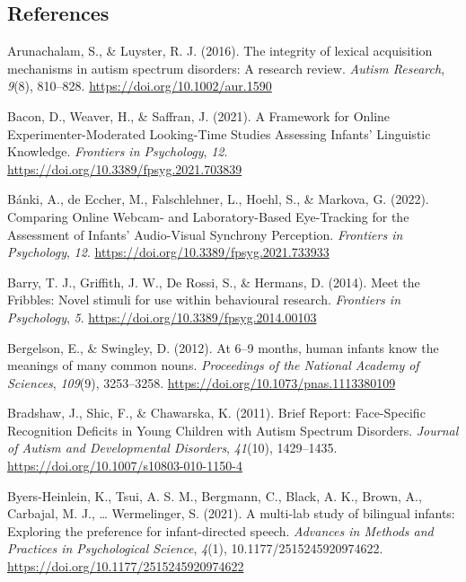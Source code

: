 \documentclass[
  english,
  man,floatsintext]{apa6}
\newlength{\cslhangindent}
\newenvironment{CSLReferences}[2] %
 {\begin{list}{}{%
  \setlength{\itemindent}{0pt}
  \setlength{\leftmargin}{0pt}
  \setlength{\parsep}{0pt}
  \ifodd #1
   \setlength{\leftmargin}{\cslhangindent}
   \setlength{\itemindent}{-1\cslhangindent}
  \fi
  \setlength{\itemsep}{#2\baselineskip}}}
 {\end{list}}
\begin{document}
\newpage

\subsection*{References}\label{references}

\protect{}\label{refs}
\begin{CSLReferences}{1}{0}
Arunachalam, S., \& Luyster, R. J. (2016). The integrity of lexical acquisition mechanisms in autism spectrum disorders: {A} research review. \emph{Autism Research}, \emph{9}(8), 810--828. \url{https://doi.org/10.1002/aur.1590}

Bacon, D., Weaver, H., \& Saffran, J. (2021). A {Framework} for {Online Experimenter-Moderated Looking-Time Studies Assessing Infants}' {Linguistic Knowledge}. \emph{Frontiers in Psychology}, \emph{12}. \url{https://doi.org/10.3389/fpsyg.2021.703839}

{Bánki, A., de Eccher, M., Falschlehner, L., Hoehl, S., \& Markova, G.} (2022). Comparing {Online Webcam-} and {Laboratory-Based Eye-Tracking} for the {Assessment} of {Infants}' {Audio-Visual Synchrony Perception}. \emph{Frontiers in Psychology}, \emph{12}. \url{https://doi.org/10.3389/fpsyg.2021.733933}

Barry, T. J., Griffith, J. W., De Rossi, S., \& Hermans, D. (2014). Meet the {Fribbles}: Novel stimuli for use within behavioural research. \emph{Frontiers in Psychology}, \emph{5}. \url{https://doi.org/10.3389/fpsyg.2014.00103}

Bergelson, E., \& Swingley, D. (2012). At 6--9 months, human infants know the meanings of many common nouns. \emph{Proceedings of the National Academy of Sciences}, \emph{109}(9), 3253--3258. \url{https://doi.org/10.1073/pnas.1113380109}

Bradshaw, J., Shic, F., \& Chawarska, K. (2011). Brief {Report}: {Face-Specific Recognition Deficits} in {Young Children} with {Autism Spectrum Disorders}. \emph{Journal of Autism and Developmental Disorders}, \emph{41}(10), 1429--1435. \url{https://doi.org/10.1007/s10803-010-1150-4}

Byers-Heinlein, K., Tsui, A. S. M., Bergmann, C., Black, A. K., Brown, A., Carbajal, M. J., \ldots{} Wermelinger, S. (2021). A multi-lab study of bilingual infants: {Exploring} the preference for infant-directed speech. \emph{Advances in Methods and Practices in Psychological Science}, \emph{4}(1), 10.1177/2515245920974622. \url{https://doi.org/10.1177/2515245920974622}


\end{CSLReferences}
\end{document}

